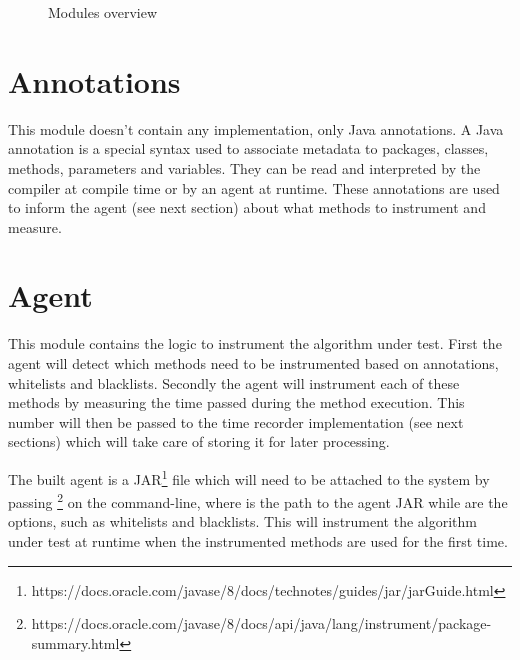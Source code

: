 \begin{figure}
  \caption{Modules overview}
  \label{fig:modules}
\end{figure}

\section{Annotations}
This module doesn't contain any implementation, only Java annotations. A Java annotation is a special syntax used to associate metadata to packages, classes, methods, parameters and variables. They can be read and interpreted by the compiler at compile time or by an agent at runtime. These annotations are used to inform the agent (see next section) about what methods to instrument and measure.


\section{Agent}
\label{sec:design:agent}
This module contains the logic to instrument the algorithm under test. First the agent will detect which methods need to be instrumented based on annotations, whitelists and blacklists. Secondly the agent will instrument each of these methods by measuring the time passed during the method execution. This number will then be passed to the time recorder implementation (see next sections) which will take care of storing it for later processing.

\noindent The built agent is a JAR\footnote{https://docs.oracle.com/javase/8/docs/technotes/guides/jar/jarGuide.html} file which will need to be attached to the system by passing \footnote{https://docs.oracle.com/javase/8/docs/api/java/lang/instrument/package-summary.html} on the command-line, where  is the path to the agent JAR while  are the options, such as whitelists and blacklists. This will instrument the algorithm under test at runtime when the instrumented methods are used for the first time.


